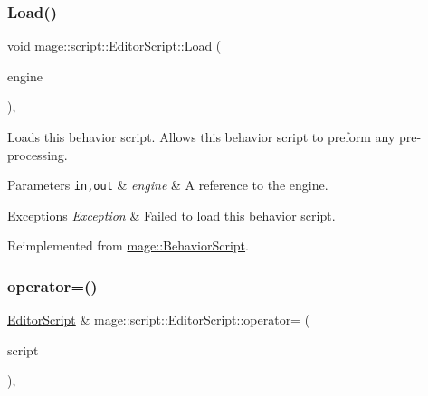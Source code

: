 \subsubsection{\texorpdfstring{Load()}{Load()}}
{\footnotesize\ttfamily void mage\+::script\+::\+Editor\+Script\+::\+Load (\begin{DoxyParamCaption}\item[{\mbox{[}\mbox{[}maybe\+\_\+unused\mbox{]} \mbox{]} \mbox{\hyperlink{classmage_1_1_engine}{Engine}} \&}]{engine }\end{DoxyParamCaption})\hspace{0.3cm}{\ttfamily [override]}, {\ttfamily [virtual]}}

Loads this behavior script. Allows this behavior script to preform any pre-\/processing.


\begin{DoxyParams}[1]{Parameters}
\mbox{\tt in,out}  & {\em engine} & A reference to the engine. \\
\hline
\end{DoxyParams}

\begin{DoxyExceptions}{Exceptions}
{\em \mbox{\hyperlink{classmage_1_1_exception}{Exception}}} & Failed to load this behavior script. \\
\hline
\end{DoxyExceptions}


Reimplemented from \mbox{\hyperlink{classmage_1_1_behavior_script_ae7864876b2ffb1d1d8d8a56e3099f1f2}{mage\+::\+Behavior\+Script}}.

\mbox{\label{classmage_1_1script_1_1_editor_script_ab7b4dda8389d07d41eba1474491b4a36}} 
\subsubsection{\texorpdfstring{operator=()}{operator=()}\hspace{0.1cm}{\footnotesize\ttfamily [1/2]}}
{\footnotesize\ttfamily \mbox{\hyperlink{classmage_1_1script_1_1_editor_script}{Editor\+Script}} \& mage\+::script\+::\+Editor\+Script\+::operator= (\begin{DoxyParamCaption}\item[{const \mbox{\hyperlink{classmage_1_1script_1_1_editor_script}{Editor\+Script}} \&}]{script }\end{DoxyParamCaption})\hspace{0.3cm}{\ttfamily [default]}, {\ttfamily [noexcept]}}

